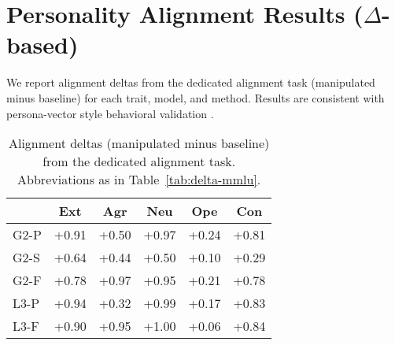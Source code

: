 \section{Personality Alignment Results (\(\Delta\)-based)}
\label{app:alignment}

We report alignment deltas from the dedicated alignment task (manipulated minus baseline) for each trait, model, and method. Results are consistent with persona-vector style behavioral validation \citep{chen-2025-persona-vectors}.

\begin{table}[H]
\centering
\scriptsize
{\setlength{\tabcolsep}{2pt}\renewcommand{\arraystretch}{0.95}%
\begin{adjustbox}{max width=\linewidth}
\begin{tabular}{lSSSSS}
\toprule
& {Ext} & {Agr} & {Neu} & {Ope} & {Con} \\
\midrule
G2-P & +0.91 & +0.50 & +0.97 & +0.24 & +0.81 \\
G2-S & +0.64 & +0.44 & +0.50 & +0.10 & +0.29 \\
G2-F & +0.78 & +0.97 & +0.95 & +0.21 & +0.78 \\
L3-P & +0.94 & +0.32 & +0.99 & +0.17 & +0.83 \\
L3-F & +0.90 & +0.95 & +1.00 & +0.06 & +0.84 \\
\bottomrule
\end{tabular}
\end{adjustbox}}
\caption{Alignment deltas (manipulated minus baseline) from the dedicated alignment task. Abbreviations as in Table~\ref{tab:delta-mmlu}.}
\label{tab:alignment-delta}
\end{table}


